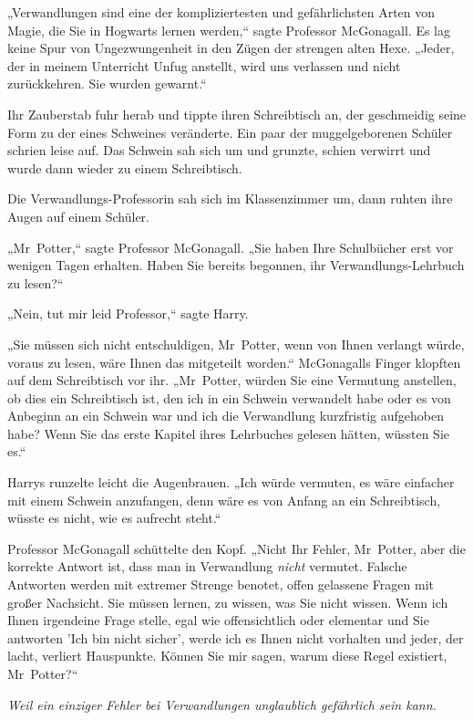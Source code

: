 {\later

„Verwandlungen sind eine der kompliziertesten und gefährlichsten Arten von Magie, die Sie in Hogwarts lernen werden,“ sagte Professor McGonagall. Es lag keine Spur von Ungezwungenheit in den Zügen der strengen alten Hexe. „Jeder, der in meinem Unterricht Unfug anstellt, wird uns verlassen und nicht zurückkehren. Sie wurden gewarnt.“

Ihr Zauberstab fuhr herab und tippte ihren Schreibtisch an, der geschmeidig seine Form zu der eines Schweines veränderte. Ein paar der muggelgeborenen Schüler schrien leise auf. Das Schwein sah sich um und grunzte, schien verwirrt und wurde dann wieder zu einem Schreibtisch.

Die Verwandlungs-Professorin sah sich im Klassenzimmer um, dann ruhten ihre Augen auf einem Schüler.

„Mr~Potter,“ sagte Professor McGonagall. „Sie haben Ihre Schulbücher erst vor wenigen Tagen erhalten. Haben Sie bereits begonnen, ihr Verwandlungs-Lehrbuch zu lesen?“

„Nein, tut mir leid Professor,“ sagte Harry.

„Sie müssen sich nicht entschuldigen, Mr~Potter, wenn von Ihnen verlangt würde, voraus zu lesen, wäre Ihnen das mitgeteilt worden.“ McGonagalls Finger klopften auf dem Schreibtisch vor ihr. „Mr~Potter, würden Sie eine Vermutung anstellen, ob dies ein Schreibtisch ist, den ich in ein Schwein verwandelt habe oder es von Anbeginn an ein Schwein war und ich die Verwandlung kurzfristig aufgehoben habe? Wenn Sie das erste Kapitel ihres Lehrbuches gelesen hätten, wüssten Sie es.“

Harrys runzelte leicht die Augenbrauen. „Ich würde vermuten, es wäre einfacher mit einem Schwein anzufangen, denn wäre es von Anfang an ein Schreibtisch, wüsste es nicht, wie es aufrecht steht.“

Professor McGonagall schüttelte den Kopf. „Nicht Ihr Fehler, Mr~Potter, aber die korrekte Antwort ist, dass man in Verwandlung \emph{nicht} vermutet. Falsche Antworten werden mit extremer Strenge benotet, offen gelassene Fragen mit großer Nachsicht. Sie müssen lernen, zu wissen, was Sie nicht wissen. Wenn ich Ihnen irgendeine Frage stelle, egal wie offensichtlich oder elementar und Sie antworten 'Ich bin nicht sicher', werde ich es Ihnen nicht vorhalten und jeder, der lacht, verliert Hauspunkte. Können Sie mir sagen, warum diese Regel existiert, Mr~Potter?“

\emph{Weil ein einziger Fehler bei Verwandlungen unglaublich gefährlich sein kann.}

}
